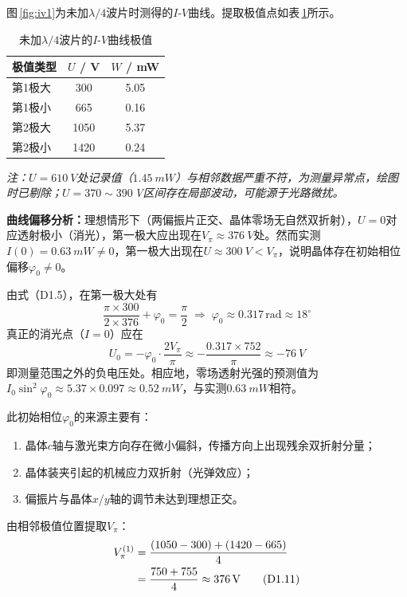 \documentclass[a4paper,8pt,twocolumn]{article}
\begin{document}
图\,\ref{fig:iv1}为未加$\lambda/4$波片时测得的$I$-$V$曲线。提取极值点如表\,\ref{tab:peaks1}所示。

\begin{table}[H]
\centering
\caption{未加$\lambda/4$波片的$I$-$V$曲线极值}
\label{tab:peaks1}
\begin{tabular}{lcc}
\toprule
极值类型 & $U$ / \si{V} & $W$ / \si{mW} \\
\midrule
第1极大 & 300  & 5.05 \\
第1极小 & 665  & 0.16 \\
第2极大 & 1050 & 5.37 \\
第2极小 & 1420 & 0.24 \\
\bottomrule
\end{tabular}
\end{table}

\noindent\textit{注：$U=\SI{610}{V}$处记录值（$\SI{1.45}{mW}$）与相邻数据严重不符，为测量异常点，绘图时已剔除；$U=370\sim390$\,V区间存在局部波动，可能源于光路微扰。}

\textbf{曲线偏移分析：}理想情形下（两偏振片正交、晶体零场无自然双折射），$U=0$对应透射极小（消光），第一极大应出现在$V_\pi\approx\SI{376}{V}$处。然而实测$I(0)=\SI{0.63}{mW}\neq0$，第一极大出现在$U\approx\SI{300}{V}<V_\pi$，说明晶体存在初始相位偏移$\varphi_0\neq0$。

由式（D1.5），在第一极大处有
\begin{equation}
  \frac{\pi\times300}{2\times376}+\varphi_0 = \frac{\pi}{2}
  \;\Rightarrow\;\varphi_0\approx0.317\,\text{rad}\approx18^\circ
  \tag{D1.9}
\end{equation}
真正的消光点（$I=0$）应在
\begin{equation}
  U_0 = -\varphi_0\cdot\frac{2V_\pi}{\pi}
  \approx -\frac{0.317\times752}{\pi}\approx-\SI{76}{V}
  \tag{D1.10}
\end{equation}
即测量范围之外的负电压处。相应地，零场透射光强的预测值为
$I_0\sin^2\varphi_0\approx5.37\times0.097\approx\SI{0.52}{mW}$，与实测$\SI{0.63}{mW}$相符。

此初始相位$\varphi_0$的来源主要有：
\begin{enumerate}[noitemsep,topsep=2pt]
  \item 晶体$c$轴与激光束方向存在微小偏斜，传播方向上出现残余双折射分量；
  \item 晶体装夹引起的机械应力双折射（光弹效应）；
  \item 偏振片与晶体$x$/$y$轴的调节未达到理想正交。
\end{enumerate}

由相邻极值位置提取$V_\pi$：
\begin{align}
  V_\pi^{(1)} &= \frac{(1050-300)+(1420-665)}{4}
  \notag\\
  &= \frac{750+755}{4} \approx \SI{376}{V}
  \tag{D1.11}
\end{align}
\end{document}
